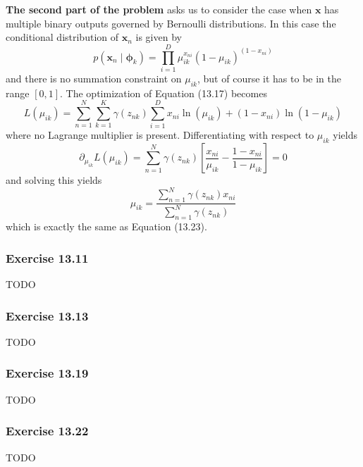 \documentclass[12pt, a4paper]{article}
\newcommand{\vect}[1]{\bm{#1}}
\begin{document}
\textbf{The second part of the problem} asks us to consider the case when $\vect{x}$ has multiple binary outputs governed by Bernoulli distributions.
In this case the conditional distribution of $\vect{x}_n$ is given by
\begin{equation*}
p(\vect{x}_n \mid \vect{\phi}_k) = \prod_{i=1}^{D} \mu_{ik}^{x_{ni}}
\left(1 - \mu_{ik}\right)^{\left( 1 - x_{ni} \right)}
\end{equation*}
and there is no summation constraint on $\mu_{ik}$, but of course it has to be in the range $[0, 1]$.
The optimization of Equation (13.17) becomes
\begin{equation*}
L(\mu_{ik}) = \sum_{n=1}^{N} \sum_{k=1}^{K} \gamma (z_{nk})
\sum_{i=1}^{D}
x_{ni} \ln \left( \mu_{ik} \right)
+ (1 - x_{ni}) \ln \left( 1 - \mu_{ik} \right)
\end{equation*}
where no Lagrange multiplier is present.
Differentiating with respect to $\mu_{ik}$ yields
\begin{equation*}
\partial_{\mu_{ik}} L(\mu_{ik}) = 
\sum_{n=1}^{N}  \gamma (z_{nk})
\left[ \frac{x_{ni}}{\mu_{ik}}
- \frac{1 - x_{ni}}{1 - \mu_{ik}}
 \right] = 0
\end{equation*}
and solving this yields
\begin{equation*}
	\mu_{ik} = \frac{\sum_{n=1}^{N} \gamma(z_{nk}) x_{ni}}{\sum_{n=1}^{N} \gamma(z_{nk})}
\end{equation*}
which is exactly the same as Equation (13.23).


\subsubsection*{Exercise 13.11}
TODO



\subsubsection*{Exercise 13.13}
TODO




\subsubsection*{Exercise 13.19}
TODO




\subsubsection*{Exercise 13.22}
TODO
\end{document}

